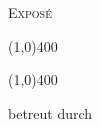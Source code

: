 \documentclass[12pt, a4paper]{article}
\begin{document}
\begin{titlepage}
	\centering
	{\scshape\LARGE \firma \par}
	\vspace{1cm}
	{\scshape\Large Exposé \par}
	\vspace{1.5cm}
	{\line(1,0){400} \par}
	{\huge\bfseries \titel \par}
	{\line(1,0){400} \par}
	\vspace{2cm}
	{\Large \fach \par }
	\vspace{1cm}
	{\Large\itshape \autor \par}
	\vfill
	{betreut durch \par}
	{\betreuertitel \ \betreuer \par}
	\vfill
	{\large \abgabedatum \par}
\end{titlepage}

\newpage
{}
\setcounter{page}{2}


 

\end{document}
